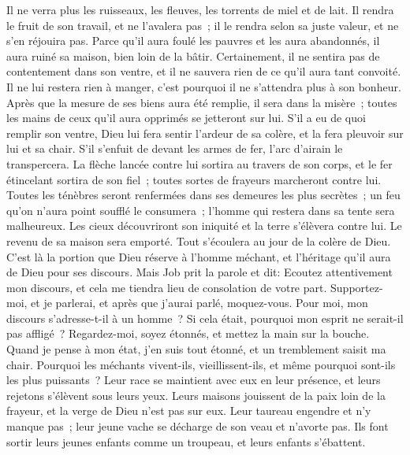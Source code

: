 \begin{multicols}{2}
Il ne verra plus les ruisseaux, les fleuves, les torrents de miel et de lait.
Il rendra le fruit de son travail, et ne l'avalera pas~; il le rendra selon sa juste valeur, et ne s'en réjouira pas.
Parce qu'il aura foulé les pauvres et les aura abandonnés, il aura ruiné sa maison, bien loin de la bâtir. 
Certainement, il ne sentira pas de contentement dans son ventre, et il ne sauvera rien de ce qu'il aura tant convoité.
Il ne lui restera rien à manger, c'est pourquoi il ne s'attendra plus à son bonheur.
Après que la mesure de ses biens aura été remplie, il sera dans la misère~; toutes les mains de ceux qu'il aura opprimés se jetteront sur lui.
S'il a eu de quoi remplir son ventre, Dieu lui fera sentir l'ardeur de sa colère, et la fera pleuvoir sur lui et sa chair.
S'il s'enfuit de devant les armes de fer, l'arc d'airain le transpercera.
La flèche lancée contre lui sortira au travers de son corps, et le fer étincelant sortira de son fiel~; toutes sortes de frayeurs marcheront contre lui.
Toutes les ténèbres seront renfermées dans ses demeures les plus secrètes~; un feu qu'on n'aura point soufflé le consumera~; l'homme qui restera dans sa tente sera malheureux.
Les cieux découvriront son iniquité et la terre s'élèvera contre lui. 
Le revenu de sa maison sera emporté. Tout s'écoulera au jour de la colère de Dieu.
C'est là la portion que Dieu réserve à l'homme méchant, et l'héritage qu'il aura de Dieu pour ses discours.
\VerseOne{}Mais Job prit la parole et dit: 
Ecoutez attentivement mon discours, et cela me tiendra lieu de consolation de votre part. 
Supportez-moi, et je parlerai, et après que j'aurai parlé, moquez-vous. 
Pour moi, mon discours s'adresse-t-il à un homme~? Si cela était, pourquoi mon esprit ne serait-il pas affligé~?
Regardez-moi, soyez étonnés, et mettez la main sur la bouche.
Quand je pense à mon état, j'en suis tout étonné, et un tremblement saisit ma chair.
Pourquoi les méchants vivent-ils, vieillissent-ils, et même pourquoi sont-ils les plus puissants~?
Leur race se maintient avec eux en leur présence, et leurs rejetons s'élèvent sous leurs yeux.
Leurs maisons jouissent de la paix loin de la frayeur, et la verge de Dieu n'est pas sur eux. 
Leur taureau engendre et n'y manque pas~; leur jeune vache se décharge de son veau et n'avorte pas.
Ils font sortir leurs jeunes enfants comme un troupeau, et leurs enfants s'ébattent. 

\end{multicols}
